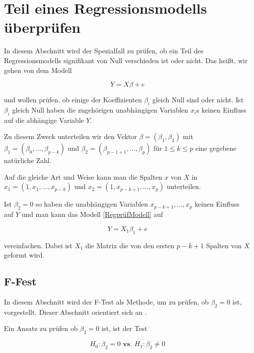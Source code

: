 \documentclass[12pt,a4paper]{article}
\theoremstyle{definition}
\theoremstyle{definition}
\theoremstyle{definition}
\theoremstyle{definition}
\begin{document}
\newpage
\section{Teil eines Regressionsmodells überprüfen}
\label{Teil eines Regressionsmodells überprüfen}
In diesem Abschnitt wird der Spezialfall zu prüfen, ob ein Teil des Regressionsmodells signifikant von Null verschieden ist oder nicht.  Das heißt, wir gehen von dem Modell

\begin{equation} \label{RegprüfModell}
Y=X \beta + e
\end{equation}

und wollen prüfen, ob einige der Koeffizienten $\beta_i$ gleich Null sind oder nicht. Ist $\beta_i$ gleich Null haben die zugehörigen unabhängigen Variablen $x_i$s keinen Einfluss auf die abhängige Variable $Y$.  

Zu diesem Zweck unterteilen wir den Vektor $\beta=(\beta_1,\beta_2)$ mit $\beta_1=(\beta_0, \ldots, \beta_{p-k})$ und $\beta_2=(\beta_{p-1+1}, \ldots, \beta_{p})$ für $1 \leq k \leq p$ eine gegebene natürliche Zahl. 

Auf die gleiche Art und Weise kann man die Spalten $x$ von $X$ in $x_1=(1,x_1, \ldots, x_{p-k})$ und $x_2=(1,x_{p-k+1}, \ldots, x_{p})$ unterteilen.

Ist $\beta_2=0$ so haben die unabhängigen Variablen $x_{p-k+1}, \ldots, x_p$ keinen Einfluss auf $Y$ und man kann das Modell \ref{RegprüfModell} auf 

\begin{equation}
Y=X_1 \beta_1 + e
\end{equation}

vereinfachen. Dabei ist $X_1$ die Matrix die von den ersten $p-k+1$ Spalten von $X$ geformt wird.

\subsection{F-Fest}
\label{F-Test-Teil}
In diesem Abschnitt wird der F-Test als Methode, um zu prüfen, ob $\beta_2=0$ ist, vorgestellt. Dieser Abschnitt orientiert sich an \cite[100-102]{Liu64}.

Ein Ansatz zu prüfen ob $\beta_2=0$ ist, ist der Test 

\begin{equation} \label{Test_prüfen}
H_{0} : \beta_{2} = 0  \textbf{ vs. }  H_{1} : \beta_{2} \neq 0
\end{equation}
\end{document}
